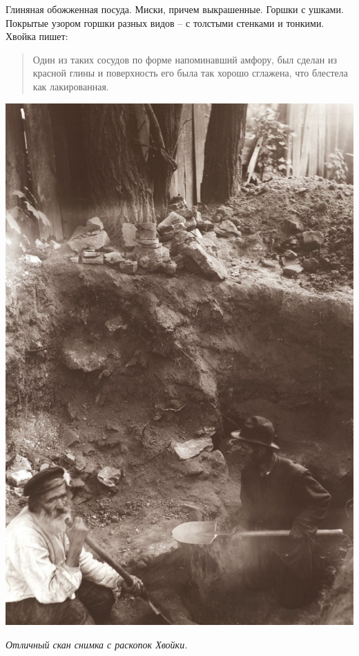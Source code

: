 Глиняная обожженная посуда. Миски, причем выкрашенные. Горшки с ушками. Покрытые узором горшки разных видов – с толстыми стенками и тонкими. Хвойка пишет:

\begin{quotation}
Один из таких сосудов по форме напоминавший амфору, был сделан из красной глины и поверхность его была так хорошо сглажена, что блестела как лакированная. 
\end{quotation}

\newpage
\vspace*{\fill}
\begin{center}
\includegraphics[width=\linewidth]{chast-kirvys/kirstoy/hvoyka-03.jpg}

\textit{Отличный скан снимка с раскопок Хвойки.}
\end{center}
\vspace*{\fill}
\newpage

